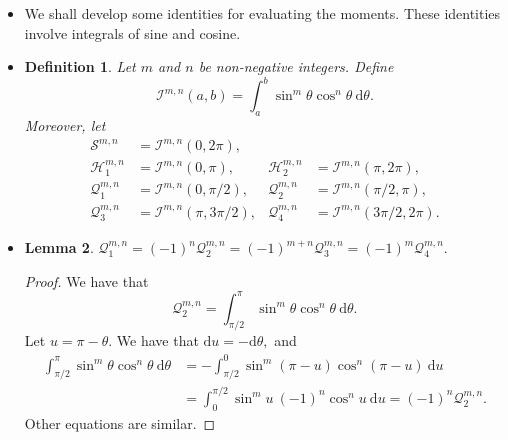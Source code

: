 \documentclass[10pt]{article}
\newtheorem{lemma}{Lemma}[section]
\newtheorem{definition}[lemma]{Definition}
\newcommand{\dee}{\mathrm{d}}
\begin{document}
		\begin{itemize}
				
			\item We shall develop some identities for evaluating 
				the moments. These identities involve integrals 
				of sine and cosine.
			
			\item \begin{definition}
				Let $m$ and $n$ be non-negative integers. Define
				$$\mathcal{I}^{m,n}(a,b) = \int_a^b \sin^m \theta \cos^n \theta \ \dee\theta.$$ Moreover, let
				\begin{align*}
					\mathcal{S}^{m,n} &= \mathcal{I}^{m,n}(0,2\pi), &\\
					\mathcal{H}_1^{m,n} &= \mathcal{I}^{m,n}(0,\pi),
					&\mathcal{H}_2^{m,n} &= \mathcal{I}^{m,n}(\pi,2\pi),\\
					\mathcal{Q}_1^{m,n} &= \mathcal{I}^{m,n}(0,\pi/2), 
					&\mathcal{Q}_2^{m,n} &= \mathcal{I}^{m,n}(\pi/2,\pi),\\
					\mathcal{Q}_3^{m,n} &= \mathcal{I}^{m,n}(\pi,3\pi/2), 
					&\mathcal{Q}_4^{m,n} &= \mathcal{I}^{m,n}(3\pi/2,2\pi).	
				\end{align*}
			\end{definition}
				
			\item \begin{lemma} \label{q-relations}
				$\mathcal{Q}_1^{m,n} = (-1)^n \mathcal{Q}_2^{m,n} = (-1)^{m+n}\mathcal{Q}_3^{m,n} = (-1)^m \mathcal{Q}_4^{m,n}.$
			\end{lemma}
			\begin{proof}
				We have that
				$$\mathcal{Q}_2^{m,n} = \int_{\pi/2}^\pi \sin^m \theta \cos^n \theta\ \dee\theta.$$
				Let $u = \pi - \theta.$ We have that $\dee u = -\dee \theta,$ and
				\begin{align*}
					\int_{\pi/2}^\pi \sin^m \theta \cos^n \theta\ \dee\theta
					&= -\int_{\pi/2}^0 \sin^m (\pi - u) \cos^n (\pi - u)\ \dee u \\
					&= \int_0^{\pi/2} \sin^m u\ (-1)^n \cos^n u\ \dee u = (-1)^n \mathcal{Q}_2^{m,n}.					
				\end{align*}
				Other equations are similar.
			\end{proof}
			

\end{itemize}
\end{document}
